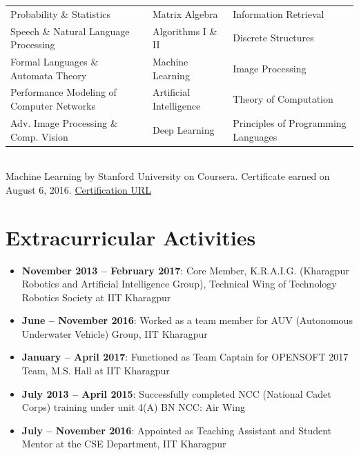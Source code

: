 \documentclass[letterpaper,11pt]{article}
\newcommand{\resumeItem}[2]{
  \item\small{
    \textbf{#1}{: #2 \vspace{-2pt}}
  }
}
\newcommand{\resumeSubItem}[2]{\resumeItem{#1}{#2}\vspace{-4pt}}
\newcommand{\resumeSubHeadingListStart}{\begin{itemize}[leftmargin=*]}
\newcommand{\resumeSubHeadingListEnd}{\end{itemize}}
\begin{document}
\begin{tabularx}{0.97\textwidth}{
    >{\hsize=1.3\hsize}X
    >{\hsize=0.6\hsize}X
    >{\hsize=1.1\hsize}X
  }
  Probability \& Statistics & Matrix Algebra & Information Retrieval \\
  Speech \& Natural Language Processing & Algorithms I \& II & Discrete Structures \\
  Formal Languages \& Automata Theory & Machine Learning & Image Processing \\
  Performance Modeling of Computer Networks & Artificial Intelligence & Theory of Computation \\
  Adv. Image Processing \& Comp. Vision & Deep Learning & Principles of Programming Languages \\
\end{tabularx}\vspace{-5pt}
\\ \vspace{10pt}
Machine Learning by Stanford University on Coursera. Certificate earned on August 6, 2016. \href{https://www.coursera.org/account/accomplishments/certificate/SEPK6P4QLXQF}{Certification URL}

\section{Extracurricular Activities}
  \resumeSubHeadingListStart
    \resumeSubItem{November 2013 -- February 2017}
      {Core Member, K.R.A.I.G. (Kharagpur Robotics and Artificial Intelligence Group), Technical Wing of Technology Robotics Society at IIT Kharagpur}
    \resumeSubItem{June -- November 2016}
      {Worked as a team member for AUV (Autonomous Underwater Vehicle) Group, IIT Kharagpur}
    \resumeSubItem{January -- April 2017}
      {Functioned as Team Captain for OPENSOFT 2017 Team, M.S. Hall at IIT Kharagpur}
    \resumeSubItem{July 2013 -- April 2015}
      {Successfully completed NCC (National Cadet Corps) training under unit 4(A) BN NCC: Air Wing}
    \resumeSubItem{July -- November 2016}
      {Appointed as Teaching Assistant and Student Mentor at the CSE Department, IIT Kharagpur}
  \resumeSubHeadingListEnd

\end{document}
